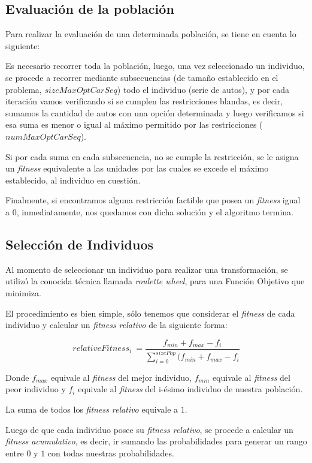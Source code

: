 \subsection{Evaluación de la población}

Para realizar la evaluación de una determinada población, se tiene en cuenta lo siguiente:

Es necesario recorrer toda la población, luego, una vez seleccionado un individuo, se procede
a recorrer mediante subsecuencias (de tamaño establecido en el problema, $sizeMaxOptCarSeq$)
todo el individuo (serie de autos), y por cada iteración vamos verificando si se cumplen las
restricciones blandas, es decir, sumamos la cantidad de autos con una opción determinada y
luego verificamos si esa suma es menor o igual al máximo permitido por las restricciones ($numMaxOptCarSeq$).

Si por cada suma en cada subsecuencia, no se cumple la restricción, se le asigna un \emph{fitness}
equivalente a las unidades por las cuales se excede el máximo establecido, al individuo en cuestión.

Finalmente, si encontramos alguna restricción factible que posea un \emph{fitness} igual a $0$,
inmediatamente, nos quedamos con dicha solución y el algoritmo termina.

\subsection{Selección de Individuos}

Al momento de seleccionar un individuo para realizar una transformación, se utilizó la conocida técnica llamada
\emph{roulette wheel}, para una Función Objetivo que minimiza.

El procedimiento es bien simple, sólo tenemos que considerar el \emph{fitness} de cada individuo y calcular un
\emph{fitness relativo} de la siguiente forma:

$$relativeFitness_{i}\ = \frac{f_{min} + f_{max} - f_{i}}{\sum\limits_{i=0}^{sizePop} (f_{min} + f_{max} - f_{i}}$$

Donde $f_{max}$ equivale al \emph{fitness} del mejor individuo,
$f_{min}$ equivale al \emph{fitness} del peor individuo y 
$f_{i}$ equivale al \emph{fitness} del i-ésimo individuo de nuestra población.

La suma de todos los \emph{fitness relativo} equivale a $1$.

Luego de que cada individuo posee su \emph{fitness relativo}, se procede a calcular un \emph{fitness acumulativo},
es decir, ir sumando las probabilidades para generar un rango entre $0$ y $1$ con todas nuestras probabilidades.


